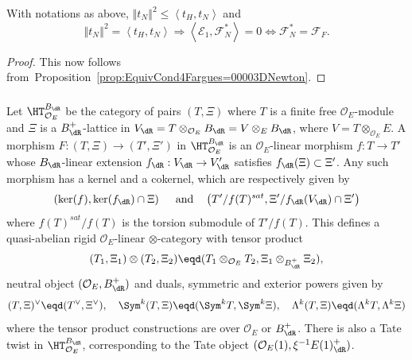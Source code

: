 \begin{prop}\label{prop:Crit4Fargues=00003DNewton}
With notations as above, $\left\Vert t_{N}\right\Vert ^{2}\leq\left\langle t_{H},t_{N}\right\rangle $ and
\[
\left\Vert t_{N}\right\Vert ^{2}=\left\langle t_{H},t_{N}\right\rangle \Longrightarrow\left\langle \mathcal{E}_{1},\mathcal{F}_{N}^{\ast}\right\rangle =0\iff\mathcal{F}_{N}^{\ast}=\mathcal{F}_{F}.
\]
\end{prop}
\begin{proof}
This now follows from~Proposition~\ref{prop:EquivCond4Fargues=00003DNewton}.
\end{proof}

\subsubsection{}

Let $\HT_{\mathcal{O}_{E}}^{B_{\dR}}$ be the category of pairs $(T,\Xi)$ where $T$ is a finite free $\mathcal{O}_{E}$-module and $\Xi$ is a $B_{\dR}^{+}$-lattice in $V_{\dR}=T\otimes_{\mathcal{O}_{E}}B_{\dR}=V\otimes_{E}B_{\dR}$, where $V=T\otimes_{\mathcal{O}_{E}}E$. A morphism $F:(T,\Xi)\rightarrow(T',\Xi')$ in $\HT_{\mathcal{O}_{E}}^{B_{\dR}}$ is an $\mathcal{O}_{E}$-linear morphism $f:T\rightarrow T'$ whose $B_{\dR}$-linear extension $f_{\dR}:V_{\dR}\rightarrow V_{\dR}^{\prime}$ satisfies $f_{\dR}(\Xi)\subset\Xi'$. Any such morphism has a kernel and a cokernel, which are respectively given by
\[
\left(\ker(f),\ker(f_{\dR})\cap\Xi\right)\quad\text{ and}\quad\left(T'/f(T)^{sat},\Xi'/f_{\dR}(V_{\dR})\cap\Xi'\right)
\]
where $f(T)^{sat}/f(T)$ is the torsion submodule of $T'/f(T)$. This defines a quasi-abelian rigid $\mathcal{O}_{E}$-linear $\otimes$-category with tensor product
\[
(T_{1},\Xi_{1})\otimes(T_{2},\Xi_{2})\eqd(T_{1}\otimes_{\mathcal{O}_{E}}T_{2},\Xi_{1}\otimes_{B_{\dR}^{+}}\Xi_{2}),
\]
neutral object $(\mathcal{O}_{E},B_{\dR}^{+})$ and duals, symmetric and exterior powers given by
\[
(T,\Xi)^{\vee}\eqd(T^{\vee},\Xi^{\vee}),\quad\Sym^{k}(T,\Xi)\eqd(\Sym^{k}T,\Sym^{k}\Xi),\quad\Lambda^{k}(T,\Xi)\eqd(\Lambda^{k}T,\Lambda^{k}\Xi)
\]
where the tensor product constructions are over $\mathcal{O}_{E}$ or $B_{\dR}^{+}$. There is also a Tate twist in $\HT_{\mathcal{O}_{E}}^{B_{\dR}}$, corresponding to the Tate object $(\mathcal{O}_{E}(1),\xi^{-1}E(1)_{\dR}^{+})$.

\subsubsection{}

